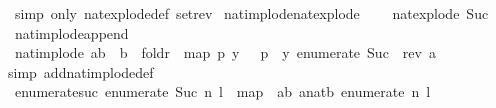 \begin{isabellebody}
\ {\isacharparenleft}{\kern0pt}simp\ only{\isacharcolon}{\kern0pt}\ nat{\isacharunderscore}{\kern0pt}explode{\isacharunderscore}{\kern0pt}def\ set{\isacharunderscore}{\kern0pt}rev{\isacharparenright}{\kern0pt}%
\endisatagproof
{\isafoldproof}%
%
\isadelimproof
\isanewline
%
\endisadelimproof
\isanewline
{}\isamarkupfalse%
\ {\isacartoucheopen}nat{\isacharunderscore}{\kern0pt}implode{\isacharparenleft}{\kern0pt}nat{\isacharunderscore}{\kern0pt}explode\ {}{}{\isacharparenright}{\kern0pt}\ {\isacharequal}{\kern0pt}\ {}{}{\isacartoucheclose}\isanewline
{}\isamarkupfalse%
\ {\isacartoucheopen}nat{\isacharunderscore}{\kern0pt}explode\ {\isacharparenleft}{\kern0pt}Suc\ {}{}{\isacharparenright}{\kern0pt}{\isacartoucheclose}\isanewline
\isanewline
\isanewline
{}\isamarkupfalse%
\ nat{\isacharunderscore}{\kern0pt}implode{\isacharunderscore}{\kern0pt}append{\isacharcolon}{\kern0pt}\ \isanewline
\ {\isacartoucheopen}nat{\isacharunderscore}{\kern0pt}implode\ {\isacharparenleft}{\kern0pt}a{\isacharat}{\kern0pt}{\isacharbrackleft}{\kern0pt}b{\isacharbrackright}{\kern0pt}{\isacharparenright}{\kern0pt}\ {\isacharequal}{\kern0pt}\ {\isacharparenleft}{\kern0pt}{}{\isacharasterisk}{\kern0pt}b\ {\isacharplus}{\kern0pt}\ foldr\ {\isacharparenleft}{\kern0pt}{\isacharplus}{\kern0pt}{\isacharparenright}{\kern0pt}\ {\isacharparenleft}{\kern0pt}map\ {\isacharparenleft}{\kern0pt}{\isasymlambda}{\isacharparenleft}{\kern0pt}p{\isacharcomma}{\kern0pt}\ y{\isacharparenright}{\kern0pt}{\isachardot}{\kern0pt}\ {}{}\ {\isacharcircum}{\kern0pt}\ p\ {\isacharasterisk}{\kern0pt}\ y{\isacharparenright}{\kern0pt}\ {\isacharparenleft}{\kern0pt}enumerate\ {\isacharparenleft}{\kern0pt}Suc\ {}{\isacharparenright}{\kern0pt}\ {\isacharparenleft}{\kern0pt}rev\ a{\isacharparenright}{\kern0pt}{\isacharparenright}{\kern0pt}{\isacharparenright}{\kern0pt}\ {}\ {\isacharparenright}{\kern0pt}{\isacartoucheclose}\isanewline
%
\isadelimproof
\ \ %
\endisadelimproof
%
\isatagproof
{}\isamarkupfalse%
{\isacharparenleft}{\kern0pt}simp\ add{\isacharcolon}{\kern0pt}nat{\isacharunderscore}{\kern0pt}implode{\isacharunderscore}{\kern0pt}def{\isacharparenright}{\kern0pt}%
\endisatagproof
{\isafoldproof}%
%
\isadelimproof
\isanewline
%
\endisadelimproof
\isanewline
{}\isamarkupfalse%
\ enumerate{\isacharunderscore}{\kern0pt}suc{\isacharcolon}{\kern0pt}\ {\isacartoucheopen}enumerate\ {\isacharparenleft}{\kern0pt}Suc\ n{\isacharparenright}{\kern0pt}\ l\ {\isacharequal}{\kern0pt}\ map\ {\isacharparenleft}{\kern0pt}{\isasymlambda}\ {\isacharparenleft}{\kern0pt}a{\isacharcomma}{\kern0pt}b{\isacharparenright}{\kern0pt}{\isachardot}{\kern0pt}\ {\isacharparenleft}{\kern0pt}a{\isacharplus}{\kern0pt}{}{\isacharcolon}{\kern0pt}{\isacharcolon}{\kern0pt}nat{\isacharcomma}{\kern0pt}b{\isacharparenright}{\kern0pt}{\isacharparenright}{\kern0pt}\ {\isacharparenleft}{\kern0pt}enumerate\ n\ l{\isacharparenright}{\kern0pt}{\isacartoucheclose}\isanewline

\end{isabellebody}
